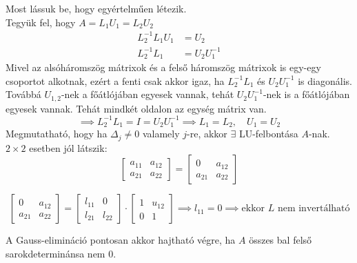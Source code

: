 Most lássuk be, hogy egyértelműen létezik. \\
Tegyük fel, hogy $A = L_{1}U_{1} = L_{2}U_{2}$
\begin{align*}
L_{2}^{-1}L_{1}U_{1} & = U_{2} \\
L_{2}^{-1}L_{1} & = U_{2}U_{1}^{-1}
\end{align*}
Mivel az alsóháromszög mátrixok és a felső háromszög mátrixok is egy-egy csoportot alkotnak, ezért a fenti csak akkor igaz, ha $L_{2}^{-1}L_{1}$ és $U_{2}U_{1}^{-1}$ is diagonális. Továbbá $U_{1, 2}$-nek a főátlójában egyesek vannak, tehát $U_{2}U_{1}^{-1}$-nek is a főátlójában egyesek vannak. Tehát mindkét oldalon az egység mátrix van.
$$
\implies L_{2}^{-1}L_{1} = I = U_{2}U_{1}^{-1} \implies L_{1} = L_{2}, \quad U_{1} = U_{2}
$$
Megmutatható, hogy ha $\Delta_{j} \neq 0$ valamely $j$-re, akkor $\exists$  LU-felbontása $A$-nak.
$2 \times 2$ esetben jól látszik:
\begin{equation*}
    \begin{bmatrix}
    a_{11} & a_{12} \\
    a_{21} & a_{22}
    \end{bmatrix}
    =
    \begin{bmatrix}
    0 & a_{12} \\
    a_{21} & a_{22}
    \end{bmatrix}
\end{equation*}

\begin{equation*}
    \begin{bmatrix}
    0 & a_{12} \\
    a_{21} & a_{22}
    \end{bmatrix}
    =
    \begin{bmatrix}
    l_{11} & 0 \\
    l_{21} & l_{22}
    \end{bmatrix}
    \cdot
    \begin{bmatrix}
    1 & u_{12} \\
    0 & 1
    \end{bmatrix}
    \implies l_{11} = 0 \implies \text{ekkor } L \text{ nem invertálható}
\end{equation*}

\begin{kov}
    A Gauss-elimináció pontosan akkor hajtható végre, ha $A$ összes bal felső sarokdeterminánsa nem $0$.
\end{kov}

